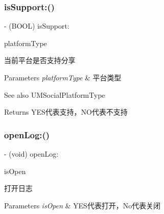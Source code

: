 \subsubsection{\texorpdfstring{is\+Support\+:()}{isSupport:()}\hspace{0.1cm}{\footnotesize\ttfamily [2/2]}}
{\footnotesize\ttfamily -\/ (B\+O\+OL) is\+Support\+: \begin{DoxyParamCaption}\item[{(U\+M\+Social\+Platform\+Type)}]{platform\+Type }\end{DoxyParamCaption}}

当前平台是否支持分享


\begin{DoxyParams}{Parameters}
{\em platform\+Type} & 平台类型 \\
\hline
\end{DoxyParams}
\begin{DoxySeeAlso}{See also}
U\+M\+Social\+Platform\+Type
\end{DoxySeeAlso}
\begin{DoxyReturn}{Returns}
Y\+E\+S代表支持，\+N\+O代表不支持 
\end{DoxyReturn}
\mbox{\label{interface_u_m_social_manager_aebc3a46ef67f494b872a130057871204}} 
\subsubsection{\texorpdfstring{open\+Log\+:()}{openLog:()}\hspace{0.1cm}{\footnotesize\ttfamily [1/2]}}
{\footnotesize\ttfamily -\/ (void) open\+Log\+: \begin{DoxyParamCaption}\item[{(B\+O\+OL)}]{is\+Open }\end{DoxyParamCaption}}

打开日志


\begin{DoxyParams}{Parameters}
{\em is\+Open} & Y\+E\+S代表打开，\+No代表关闭 \\
\hline
\end{DoxyParams}
\mbox{\label{interface_u_m_social_manager_aebc3a46ef67f494b872a130057871204}} 
